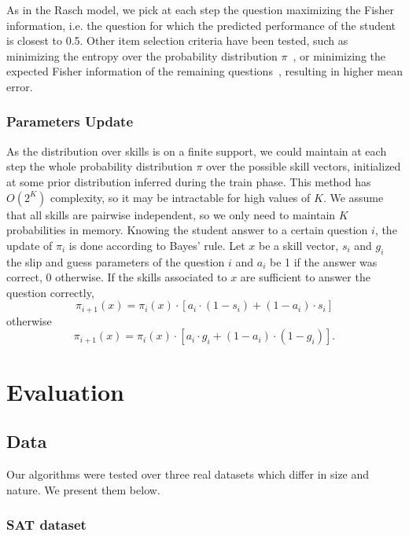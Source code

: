 \documentclass{edm_template}
\begin{document}
As in the Rasch model, we pick at each step the question maximizing the Fisher information, i.e. the question for which the predicted performance of the student is closest to 0.5. Other item selection criteria have been tested, such as minimizing the entropy over the probability distribution $\pi$~\cite{Huebner2010}, or minimizing the expected Fisher information of the remaining questions~\cite{MagisRaiche2012}, resulting in higher mean error.

\subsubsection{Parameters Update}

As the distribution over skills is on a finite support, we could maintain at each step the whole probability distribution $\pi$ over the possible skill vectors, initialized at some prior distribution inferred during the train phase. This method has $O(2^K)$ complexity, so it may be intractable for high values of $K$. We assume that all skills are pairwise independent, so we only need to maintain $K$ probabilities in memory.
Knowing the student answer to a certain question $i$, the update of $\pi_i$ is done according to Bayes' rule. Let $x$ be a skill vector, $s_i$ and $g_i$ the slip and guess parameters of the question $i$ and $a_i$ be 1 if the answer was correct, 0 otherwise. If the skills associated to $x$ are sufficient to answer the question correctly,
\[ \pi_{i+1}(x) = \pi_i(x) \cdot [a_i \cdot(1-s_i) + (1-a_i)\cdot s_i] \]
otherwise
\[ \pi_{i+1}(x) = \pi_i(x) \cdot [a_i \cdot g_i + (1-a_i)\cdot(1-g_i)]. \]

\section{Evaluation}

\subsection{Data} %

Our algorithms were tested over three real datasets which differ in size and nature. We present them below.

\subsubsection{SAT dataset}
\end{document}
